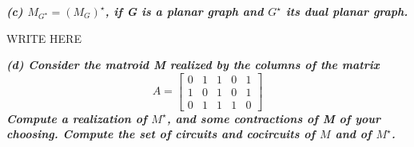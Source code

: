 \vspace{3pt}

\hspace{5pt} \textbf{\textit{(c) $M_{G^\star} = \left(M_G\right)^\star$, if G is a planar graph and $G^\star$ its dual planar graph.}}


\vspace{3pt}

WRITE HERE

\vspace{3pt}

\hspace{5pt} \textbf{\textit{(d) Consider the matroid M realized by the columns of the matrix}}
$$
A = \left[
    \begin{array}{ccccc}
        0 & 1 & 1 & 0 & 1 \\
        1 & 0 & 1 & 0 & 1 \\
        0 & 1 & 1 & 1 & 0
    \end{array}
\right]
$$
\textbf{\textit{Compute a realization of $M^\star$, and some contractions of M of your choosing. Compute the set of circuits and cocircuits of $M$ and of $M^\star$.}}

\vspace{5pt}

